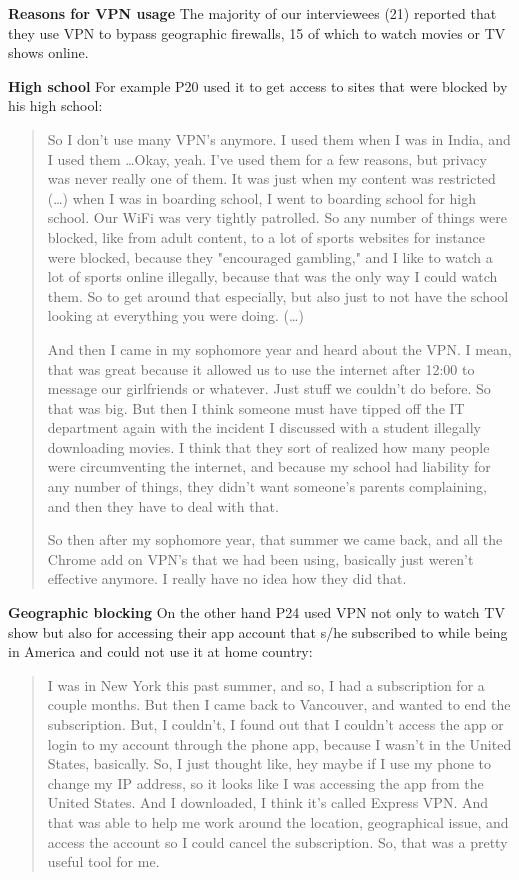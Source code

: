 \textbf{Reasons for VPN usage} The majority of our interviewees (21) reported
that they use VPN to bypass geographic firewalls, 15 of which to watch movies
or TV shows online.  

\textbf{High school} For example P20 used it to get access to sites that were
blocked by his high school: 
\begin{quote}So I don't use many VPN's anymore. I used them when I was in
    India, and I used them \dots Okay, yeah. I've used them for a few reasons,
    but privacy was never really one of them. It was just when my content was
    restricted (\dots) when I was in boarding school, I went to boarding
    school for high school. Our WiFi was very tightly patrolled. So any number
    of things were blocked, like from adult content, to a lot of sports
    websites for instance were blocked, because they "encouraged gambling,"
    and I like to watch a lot of sports online illegally, because that was the
    only way I could watch them. So to get around that especially, but also
    just to not have the school looking at everything you were doing. (\dots) 

And then I came in my sophomore year and heard about the VPN. I mean, that was
    great because it allowed us to use the internet after 12:00 to message our
    girlfriends or whatever. Just stuff we couldn't do before. So that was
    big. But then I think someone must have tipped off the IT department again
    with the incident I discussed with a student illegally downloading movies.
    I think that they sort of realized how many people were circumventing the
    internet, and because my school had liability for any number of things,
    they didn't want someone's parents complaining, and then they have to deal
    with that.


So then after my sophomore year, that summer we came back, and all the Chrome
add on VPN's that we had been using, basically just weren't effective anymore.
I really have no idea how they did that.\end{quote}


\textbf{Geographic blocking} On the other hand P24 used VPN not only to watch
TV show but also for accessing their app account that s/he subscribed to while
being in America and could not use it at home country: \begin{quote}I was in
New York this past summer, and so, I had a subscription for a couple months.
But then I came back to Vancouver, and wanted to end the subscription. But, I
couldn't, I found out that I couldn't access the app or login to my account
through the phone app, because I wasn't in the United States, basically. So, I
just thought like, hey maybe if I use my phone to change my IP address, so it
looks like I was accessing the app from the United States. And I downloaded, I
think it's called Express VPN. And that was able to help me work around the
location, geographical issue, and access the account so I could cancel the
subscription. So, that was a pretty useful tool for me.\end{quote}


